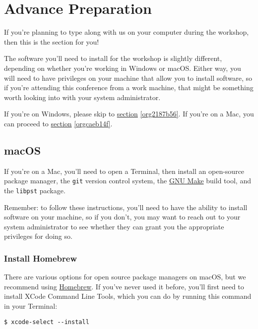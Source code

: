 \documentclass[11pt]{article}
\begin{document}
\section{Advance Preparation \label{org5abddcf}}
\label{sec:org868be0f}

If you're planning to type along with us on your computer during the
workshop, then this is the section for you!

The software you'll need to install for the workshop is slightly
different, depending on whether you're working in Windows or macOS.
Either way, you will need to have privileges on your machine that
allow you to install software, so if you're attending this conference
from a work machine, that might be something worth looking into with
your system administrator.

If you're on Windows, please skip to \hyperref[org2187b56]{section} \ref{org2187b56}.  If you're on a
Mac, you can proceed to \hyperref[orgcaeb14f]{section} \ref{orgcaeb14f}.

\subsection{macOS \label{orgcaeb14f}}
\label{sec:org6bee577}

If you're on a Mac, you'll need to open a Terminal, then install an
open-source package manager, the \texttt{git} version control system, the
\href{https://www.gnu.org/software/make/}{GNU Make} build tool, and the
\texttt{libpst} package.

Remember: to follow these instructions, you'll need to have the
ability to install software on your machine, so if you don't, you may
want to reach out to your system administrator to see whether they can
grant you the appropriate privileges for doing so.

\subsubsection{Install Homebrew}
\label{sec:org6eeddf7}

There are various options for open source package managers on macOS,
but we recommend using \href{https://brew.sh}{Homebrew}.  If you've never used it
before, you'll first need to install XCode Command Line Tools, which
you can do by running this command in your Terminal:

\begin{verbatim}
$ xcode-select --install
\end{verbatim}
\end{document}
